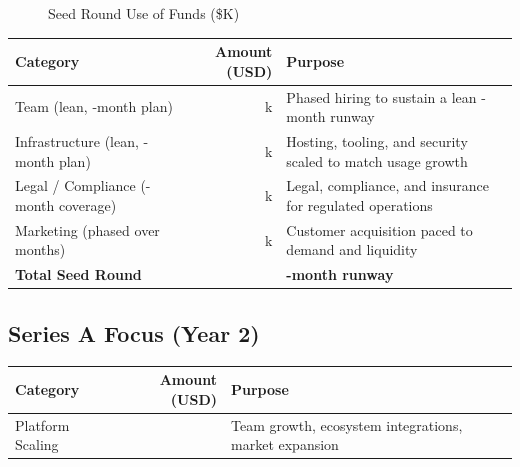 \begin{figure}[H]
\centering
{}
\caption{Seed Round Use of Funds (\$K)}
\end{figure}
\begin{table}[H]
\centering
\begin{tabularx}{\linewidth}{l r L}
\toprule
Category & Amount (USD) & Purpose \\\midrule
Team (lean, \numint{\seedRunwayMonths}-month plan) & k & Phased hiring to sustain a lean \numint{\seedRunwayMonths}-month runway \\
Infrastructure (lean, \numint{\seedRunwayMonths}-month plan) & k & Hosting, tooling, and security scaled to match usage growth \\
Legal / Compliance (\numint{\seedRunwayMonths}-month coverage) & k & Legal, compliance, and insurance for regulated operations \\
Marketing (phased over \numint{\seedRunwayMonths} months) & k & Customer acquisition paced to demand and liquidity \\
\textbf{Total Seed Round} & \textbf{\numint{\seedAmount}} & \textbf{\numint{\seedRunwayMonths}-month runway} \\
\bottomrule
\end{tabularx}
\end{table}

\subsection{Series A Focus (Year 2)}
\begin{table}[H]
\centering
\begin{tabularx}{\linewidth}{l r L}
\toprule
Category & Amount (USD) & Purpose \\\midrule
Platform Scaling & \numint{\seriesAAmount} & Team growth, ecosystem integrations, market expansion \\
\bottomrule
\end{tabularx}
\end{table}

